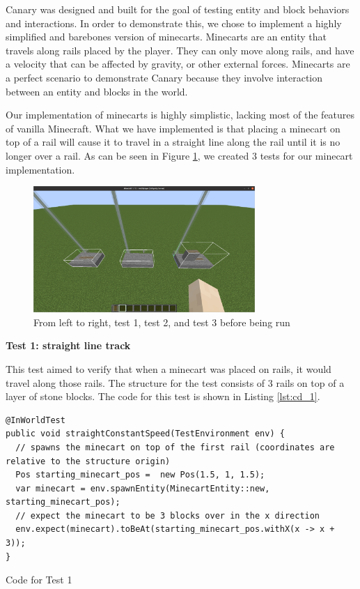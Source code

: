 \documentclass[12pt]{article}
\begin{document}
\begin{onehalfspacing}
Canary was designed and built for the goal of testing entity and
block behaviors and interactions. In order to demonstrate this, we chose
to implement a highly simplified and barebones version of minecarts.
Minecarts are an entity that travels along rails placed by the player.
They can only move along rails, and have a velocity that can be affected
by gravity, or other external forces. Minecarts are a perfect scenario
to demonstrate Canary because they involve interaction between an entity
and blocks in the world.

Our implementation of minecarts is highly simplistic, lacking most of
the features of vanilla Minecraft. What we have implemented is that
placing a minecart on top of a rail will cause it to travel in a
straight line along the rail until it is no longer over a rail. As can
be seen in Figure \ref{fig:5_1_1_1}, we created 3 tests for our minecart
implementation.

\begin{figure}[H] 
    \centering
    \includegraphics[width=0.75\textwidth]{media/media/image15.png} 
    \caption{From left to right, test 1, test 2, and test 3 before being run}
    \label{fig:5_1_1_1}  
\end{figure}


\noindent\textbf{Test 1: straight line track}

This test aimed to verify that when a minecart was placed on rails, it
would travel along those rails. The structure for the test consists of 3
rails on top of a layer of stone blocks. The code for this test is shown
in Listing \ref{lst:cd_1}.


\begin{listing}[H]
\begin{verbatim}
@InWorldTest
public void straightConstantSpeed(TestEnvironment env) {
  // spawns the minecart on top of the first rail (coordinates are relative to the structure origin)
  Pos starting_minecart_pos =  new Pos(1.5, 1, 1.5);
  var minecart = env.spawnEntity(MinecartEntity::new, starting_minecart_pos);
  // expect the minecart to be 3 blocks over in the x direction
  env.expect(minecart).toBeAt(starting_minecart_pos.withX(x -> x + 3));
}
\end{verbatim}
\caption{Code for Test 1}
\label{lst:cd_1}
\end{listing}


\end{onehalfspacing}
\end{document}
